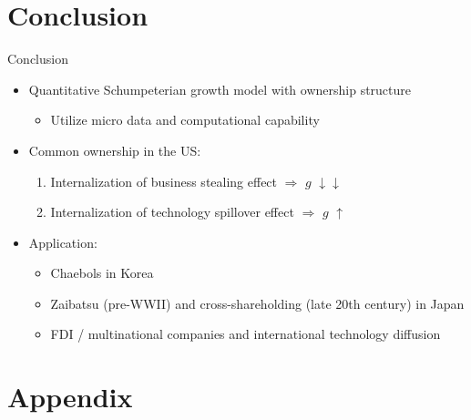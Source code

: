 \documentclass[
  aspectratio=169,  %
]{beamer}
\theoremstyle{plain}
\begin{document}
\section{Conclusion}
\begin{frame}{Conclusion}
  \begin{itemize}
    \item Quantitative Schumpeterian growth model with ownership structure
          \begin{itemize}
            \item Utilize micro data and computational capability
          \end{itemize}
          \medskip{}
    \item Common ownership in the US:
          \begin{enumerate}
            \item Internalization of business stealing effect $\Longrightarrow$ $g$ $\downarrow$$\downarrow$
            \item Internalization of technology spillover effect $\Longrightarrow$ $g$ $\uparrow$
          \end{enumerate}
          \medskip{}
    \item Application:
          \begin{itemize}
            \item Chaebols in Korea
            \item Zaibatsu (pre-WWII) and cross-shareholding (late 20th century) in Japan
            \item FDI / multinational companies and international technology diffusion
          \end{itemize}
  \end{itemize}
\end{frame}

\appendix

\section{Appendix}
\end{document}
